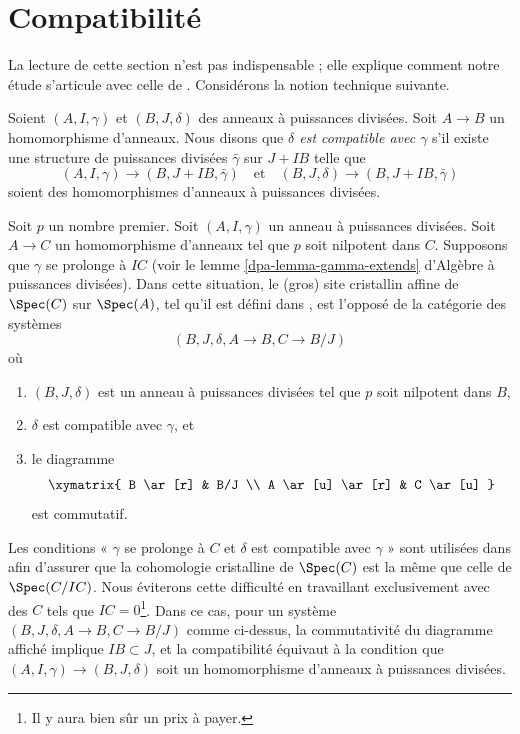 \section{Compatibilité}
\label{section-compatibility}

\noindent
La lecture de cette section n'est pas indispensable ; elle explique comment notre étude
s'articule avec celle de \cite{Berthelot}.
Considérons la notion technique suivante.

\begin{definition}
\label{definition-compatible}
Soient $(A, I, \gamma)$ et $(B, J, \delta)$ des anneaux à puissances divisées.
Soit $A \to B$ un homomorphisme d'anneaux. Nous disons que
{\it $\delta$ est compatible avec $\gamma$}
s'il existe une structure de puissances divisées $\bar\gamma$ sur
$J + IB$ telle que
$$
(A, I, \gamma) \to (B, J + IB, \bar \gamma)\quad\text{et}\quad
(B, J, \delta) \to (B, J + IB, \bar \gamma)
$$
soient des homomorphismes d'anneaux à puissances divisées.
\end{definition}

\noindent
Soit $p$ un nombre premier. Soit $(A, I, \gamma)$ un anneau à puissances divisées.
Soit $A \to C$ un homomorphisme d'anneaux tel que $p$ soit nilpotent dans $C$.
Supposons que $\gamma$ se prolonge à $IC$ (voir le
lemme \ref{dpa-lemma-gamma-extends} d'Algèbre à puissances divisées).
Dans cette situation, le (gros) site cristallin affine de
$\Spec(C)$ sur $\Spec(A)$,
tel qu'il est défini dans \cite{Berthelot},
est l'opposé de la catégorie des systèmes
$$
(B, J, \delta, A \to B, C \to B/J)
$$
où
\begin{enumerate}
\item $(B, J, \delta)$ est un anneau à puissances divisées tel que $p$ soit nilpotent dans $B$,
\item $\delta$ est compatible avec $\gamma$, et
\item le diagramme
$$
\xymatrix{
B \ar[r] & B/J \\
A \ar[u] \ar[r] & C \ar[u]
}
$$
est commutatif.
\end{enumerate}
Les conditions
« $\gamma$ se prolonge à $C$ et $\delta$ est compatible avec $\gamma$ »
sont utilisées dans \cite{Berthelot} afin d'assurer que
la cohomologie cristalline de $\Spec(C)$ est la même que celle de
$\Spec(C/IC)$. Nous éviterons cette difficulté
en travaillant exclusivement avec des $C$ tels que $IC = 0$\footnote{Il y aura bien sûr
un prix à payer.}. Dans ce cas,
pour un système $(B, J, \delta, A \to B, C \to B/J)$ comme ci-dessus,
la commutativité du diagramme affiché implique $IB \subset J$, et
la compatibilité équivaut à la condition que
$(A, I, \gamma) \to (B, J, \delta)$ soit un homomorphisme d'anneaux à
puissances divisées.




